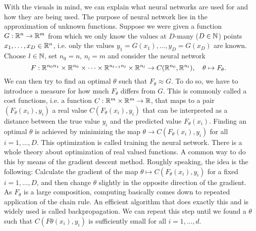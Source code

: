 With the visuals in mind, we can explain what neural networks are used for and how they are being used. 
The purpose of neural network lies in the  approximation of unknown functions. 
Suppose we were given a function $G:\mathbb{R}^n\to\mathbb{R}^m$ from which we only know the values at $D$-many ($D\in\mathbb{N}$) points $x_1,\dots,x_D\in\mathbb{R}^n$, 
i.e. only the values $y_1=G(x_1),\dots,y_D=G(x_D)$ are known.
Choose $l\in\mathbb{N}$, set $n_0=n$, $n_l=m$ and consider the neural network
\begin{equation*}
    F:\mathbb{R}^{n_0n_1}\times\mathbb{R}^{n_0}\times\dots\times\mathbb{R}^{n_{l-1}n_l}\times\mathbb{R}^{n_l}\to C(\mathbb{R}^{n_0},\mathbb{R}^{n_l}), \quad\theta\mapsto F_\theta.
\end{equation*}
We can then try to find an \glqq{}optimal\grqq{} $\theta$ such that $F_\theta\approx G$. 
To do so, we have to introduce a measure for how much $F_\theta$ differs from $G$. 
This is commonly called a cost functions, i.e. a function $C:\mathbb{R}^m\times\mathbb{R}^m\to\mathbb{R}$, that maps to a pair $(F_\theta(x_i), y_i)$ a real value
$C(F_\theta(x_i),y_i)$ that can be interpreted as a distance between the true value $y_i$ and the predicted value $F_\theta(x_i)$.
Finding an optimal $\theta$ is achieved by minimizing the map $\theta\to C(F_\theta(x_i),y_i)$ for all $i=1,\dots,D$.
This optimization is called \glqq{}training the neural network\grqq{}. 
There is a whole theory about optimization of real valued functions. A common way to do this by means of the gradient descent method.
Roughly speaking, the idea is the following: Calculate the gradient of the map $\theta\mapsto C(F_\theta(x_i),y_i)$ for a fixed $i=1,\dots,D$, 
and then change $\theta$ slightly in the opposite direction of the gradient. 
As $F_\theta$ is a large composition, computing basically comes down to repeated application of the chain rule. 
An efficient algorithm that does exactly this and is widely used is called backpropagation. We can repeat this step until we found a $\theta$ such that 
$C(F\theta(x_i),y_i)$ is sufficiently small for all $i=1,\dots,d$.